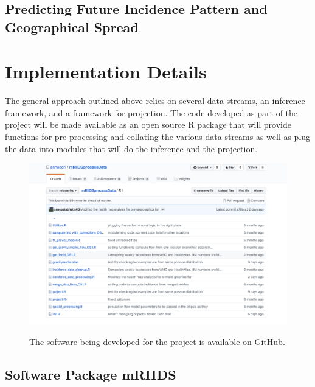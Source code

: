 \documentclass[11pt,]{article}
\begin{document}
\subsection{Predicting Future Incidence Pattern and Geographical Spread}

\section{Implementation Details}

The general approach outlined above relies on several data streams, an
inference framework, and a framework for projection. The code
developed as part of the project will be made available as an open
source R package that will provide functions for pre-processing and
collating the various data streams as well as plug the data into
modules that will do the inference and the projection. 

\begin{figure}
  \includegraphics[scale = 0.5]{ms6-figures/github-screenshot}
  \label{fig:github}
  \caption{The software being developed for the project is available
    on GitHub.}
\end{figure}

\subsection{Software Package mRIIDS}
\end{document}
